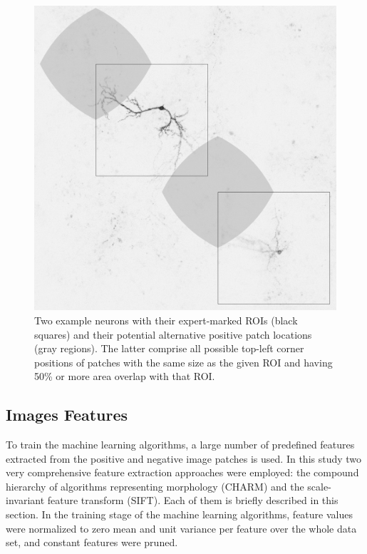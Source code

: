 \begin{figure}
	\begin{minipage}{0.3\textwidth}
		\includegraphics[width=\textwidth]{fig02}
	\end{minipage}
	\hspace{0.02\textwidth}
	\begin{minipage}{0.65\textwidth}
		\caption{Two example neurons with their expert-marked ROIs (black squares) and their potential alternative positive patch locations (gray regions). The latter comprise all possible top-left corner positions of patches with the same size as the given ROI and having 50\% or more area overlap with that ROI.}
		\label{ch5_fig2}
	\end{minipage}
\end{figure}
\subsection{Images Features}
\label{subsec:imageFeaturesExtraction}
To train the machine learning algorithms, a large number of predefined features extracted from the positive and negative image patches is used. In this study two very comprehensive feature extraction approaches were employed: the compound hierarchy of algorithms representing morphology (CHARM) and the scale-invariant feature transform (SIFT). Each of them is briefly described in this section. In the training stage of the machine learning algorithms, feature values were normalized to zero mean and unit variance per feature over the whole data set, and constant features were pruned.

